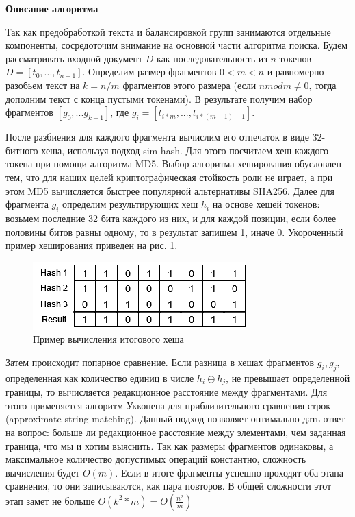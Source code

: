 \documentclass[14pt]{matmex-diploma-custom}
\begin{document}
\textbf{Описание алгоритма}

Так как предобработкой текста и балансировкой групп занимаются отдельные компоненты, сосредоточим внимание на основной части алгоритма поиска. Будем рассматривать входной документ $D$ как последовательность из $n$ токенов $D = [t_0,...,t_{n-1}]$. Определим размер фрагментов $0 < m < n$ и равномерно разобьем текст на $k = n / m$ фрагментов этого размера (если $n mod m \ne 0$, тогда дополним текст с конца пустыми токенами). В результате получим набор фрагментов $[g_0,...g_{k-1}]$, где $g_i = [t_{i * m},...,t_{i * (m + 1) - 1}]$. 

После разбиения для каждого фрагмента вычислим его отпечаток в виде 32-битного хеша, используя подход sim-hash\cite{bib:art:SimHash}. Для этого посчитаем хеш каждого токена при помощи алгоритма MD5\cite{bib:art:MD5}. Выбор алгоритма хеширования обусловлен тем, что для наших целей криптографическая стойкость роли не играет, а при этом MD5 вычисляется быстрее популярной альтернативы SHA256\cite{bib:art:MD5vsSHA256}. Далее для фрагмента $g_i$ определим результирующих хеш $h_i$ на основе хешей токенов: возьмем последние 32 бита каждого из них, и для каждой позиции, если более половины битов равны одному, то в результат запишем 1, иначе 0. Укороченный пример хеширования приведен на рис. \ref{fig:Hashing}.

\begin{figure}[h!]
	\includegraphics[scale=0.9]{pictures/Hash.png}
	\centering
	\caption{Пример вычисления итогового хеша}
	\label{fig:Hashing}
\end{figure}

Затем происходит попарное сравнение. Если разница в хешах фрагментов $g_i, g_j$, определенная как количество единиц в числе $h_i \oplus h_j$, не превышает определенной границы, то вычисляется редакционное расстояние между фрагментами. Для этого применяется алгоритм Укконена \cite{bib:art:UkkonenASM} для приблизительного сравнения строк (approximate string matching). Данный подход позволяет оптимально дать ответ на вопрос: больше ли редакционное расстояние между элементами, чем заданная граница, что мы и хотим выяснить. Так как размеры фрагментов одинаковы, а максимальное количество допустимых операций константно, сложность вычисления будет $O(m)$. Если в итоге фрагменты успешно проходят оба этапа сравнения, то они записываются, как пара повторов. В общей сложности этот этап замет не больше $O(k^2 * m) = O(\frac{n^2}{m})$
\end{document}
